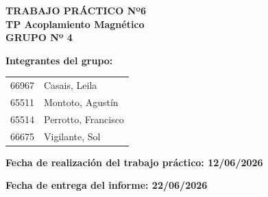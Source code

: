 \begin{center}
    
    {\large \textbf{TRABAJO PRÁCTICO Nº6}}\\[0.5cm]
    
    {\Large \textbf{TP Acoplamiento Magnético
}}\\[1cm]
    
    {\normalsize \textbf{GRUPO Nº 4}}\\[0.5cm]

\end{center}

\vspace{0.5cm}

\textbf{Integrantes del grupo:}

\vspace{0.3cm}

\begin{tabular}{p{5cm} p{8cm}}
66967 & Casais, Leila \\
65511 & Montoto, Agustín \\
65514 & Perrotto, Francisco \\
66675 & Vigilante, Sol \\
\end{tabular}

\vspace{0.8cm}

\textbf{Fecha de realización del trabajo práctico: 12/06/2026} \\
\vspace{0.3cm}

\textbf{Fecha de entrega del informe: 22/06/2026}

\vspace{1cm}

\newpage